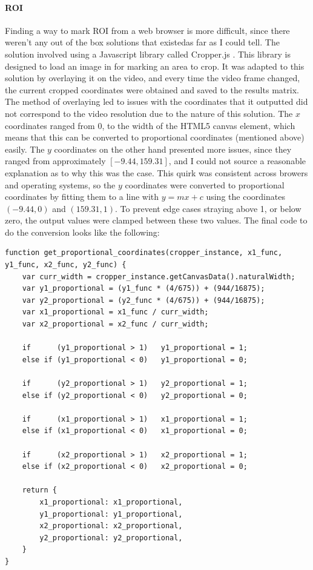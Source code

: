             \paragraph{ROI}
            Finding a way to mark ROI from a web browser is more difficult, since there weren't any out of the box solutions that existedas far as I could tell. The solution involved using a Javascript library called Cropper.js \cite{cropperjs}. This library is designed to load an image in for marking an area to crop. It was adapted to this solution by overlaying it on the video, and every time the video frame changed, the current cropped coordinates were obtained and saved to the results matrix. The method of overlaying led to issues with the coordinates that it outputted did not correspond to the video resolution due to the nature of this solution. The $x$ coordinates ranged from 0, to the width of the HTML5 canvas element, which means that this can be converted to proportional coordinates (mentioned above) easily. The $y$ coordinates on the other hand presented more issues, since they ranged from approximately $[-9.44, 159.31]$, and I could not source a reasonable explanation as to why this was the case. This quirk was consistent across browers and operating systems, so the $y$ coordinates were converted to proportional coordinates by fitting them to a line with $y=mx+c$ using the coordinates $(-9.44,0)$ and $(159.31,1)$. To prevent edge cases straying above 1, or below zero, the output values were clamped between these two values. The final code to do the conversion looks like the following:

            \begin{lstlisting}[style=JSStyle]
function get_proportional_coordinates(cropper_instance, x1_func, y1_func, x2_func, y2_func) {
    var curr_width = cropper_instance.getCanvasData().naturalWidth;
    var y1_proportional = (y1_func * (4/675)) + (944/16875);
    var y2_proportional = (y2_func * (4/675)) + (944/16875);
    var x1_proportional = x1_func / curr_width;
    var x2_proportional = x2_func / curr_width;

    if      (y1_proportional > 1)   y1_proportional = 1;
    else if (y1_proportional < 0)   y1_proportional = 0;

    if      (y2_proportional > 1)   y2_proportional = 1;
    else if (y2_proportional < 0)   y2_proportional = 0;

    if      (x1_proportional > 1)   x1_proportional = 1;
    else if (x1_proportional < 0)   x1_proportional = 0;

    if      (x2_proportional > 1)   x2_proportional = 1;
    else if (x2_proportional < 0)   x2_proportional = 0;
    
    return {
        x1_proportional: x1_proportional,
        y1_proportional: y1_proportional,
        x2_proportional: x2_proportional,
        y2_proportional: y2_proportional,
    }
}\end{lstlisting} 


